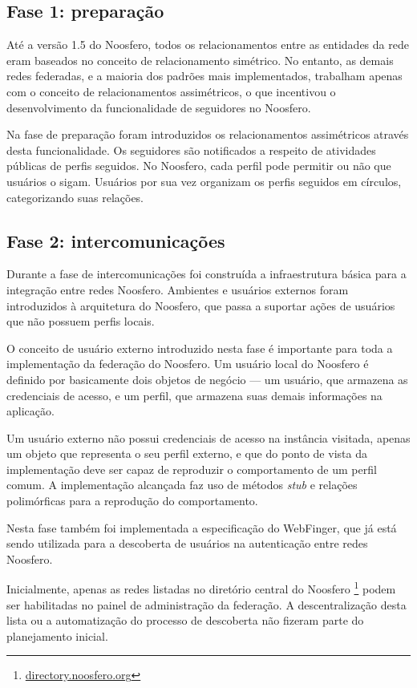 \begin{apendicesenv}
\subsection{Fase 1: preparação}

Até a versão 1.5 do Noosfero, todos os relacionamentos entre as entidades da rede
eram baseados no conceito de relacionamento simétrico. No entanto, as demais redes
federadas, e a maioria dos padrões mais implementados, trabalham apenas com o
conceito de relacionamentos assimétricos, o que incentivou o desenvolvimento da
funcionalidade de seguidores no Noosfero.

Na fase de preparação foram introduzidos os relacionamentos assimétricos através
desta funcionalidade. Os seguidores são notificados a respeito de atividades
públicas de perfis seguidos. No Noosfero, cada perfil pode permitir ou não que
usuários o sigam. Usuários por sua vez organizam os perfis seguidos em círculos,
categorizando suas relações.

\subsection{Fase 2: intercomunicações}

Durante a fase de intercomunicações foi construída a infraestrutura básica para a
integração entre redes Noosfero. Ambientes e usuários externos foram introduzidos à
arquitetura do Noosfero, que passa a suportar ações de usuários que não possuem
perfis locais.

O conceito de usuário externo introduzido nesta fase é importante para toda a
implementação da federação do Noosfero. Um usuário local do Noosfero é definido por
basicamente dois objetos de negócio --- um usuário, que armazena as credenciais de
acesso, e um perfil, que armazena suas demais informações na aplicação.

Um usuário externo não possui credenciais de acesso na instância visitada, apenas um
objeto que representa o seu perfil externo, e que do ponto de vista da implementação
deve ser capaz de reproduzir o comportamento de um perfil comum. A implementação
alcançada faz uso de métodos \textit{stub} e relações polimórficas para a reprodução
do comportamento.

Nesta fase também foi implementada a especificação do WebFinger, que já está sendo
utilizada para a descoberta de usuários na autenticação entre redes Noosfero.

Inicialmente, apenas as redes listadas no diretório central do Noosfero
\footnote{\url{directory.noosfero.org}} podem ser habilitadas no painel de
administração da federação. A descentralização desta lista ou a automatização do
processo de descoberta não fizeram parte do planejamento inicial.


\end{apendicesenv}
